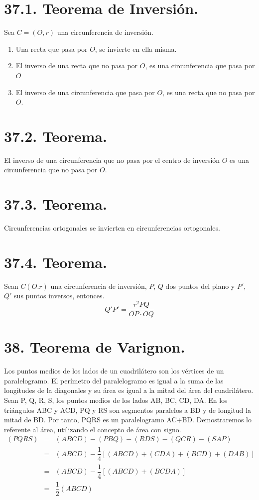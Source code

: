 \documentclass[12pt,a4paper, oneside]{book}
\begin{document}
\section{37.1. Teorema de Inversión.}
Sea $C=(O, r)$ una circunferencia de inversión. 
\begin{enumerate}
\item Una recta que pasa por $O$, se invierte en ella misma.
\item El inverso de una recta que no pasa por $O$, es una circunferencia que pasa por $O$
\item El inverso de una circunferencia que pasa por $O$, es una recta que no pasa por $O$.
\end{enumerate}
\section{37.2. Teorema.}
El inverso de una circunferencia que no pasa por el centro de inversión $O$ es una circunferencia que no pasa por $O$.
\section{37.3. Teorema.}
Circunferencias ortogonales se invierten en circunferencias ortogonales.
\section{37.4. Teorema.}
Sean $C(O. r)$ una circunferencia de inversión, $P$, $Q$ dos puntos del plano y $P'$, $Q'$ sus puntos inversos, entonces.$$Q'P'= \dfrac{r^2PQ}{OP \cdot OQ}$$
\section{38. Teorema de Varignon.}
Los puntos medios de los lados de un cuadrilátero son los vértices de un paralelogramo. El perímetro del paralelogramo es igual a la suma de las longitudes de la diagonales y su área es igual a la mitad del área del cuadrilátero. 
\\
Sean P, Q, R, S, los puntos medios de los lados AB, BC, CD, DA. En los triángulos ABC y ACD, PQ y RS son segmentos paralelos a BD y de longitud la mitad de BD. Por tanto, PQRS es un paralelogramo AC+BD.
Demostraremos lo referente al área, utilizando el concepto de área con signo.
\begin{eqnarray*}
(PQRS) &=& (ABCD)- (PBQ)- (RDS) - (QCR)- (SAP)
\\&=&(ABCD)-\dfrac{1}{4}[(ABCD)+(CDA)+(BCD)+ (DAB) ]
\\&=&(ABCD)-\dfrac{1}{4}[(ABCD)+ (BCDA)]
\\&=&\dfrac{1}{2}(ABCD) 
\end{eqnarray*}
\end{document}
